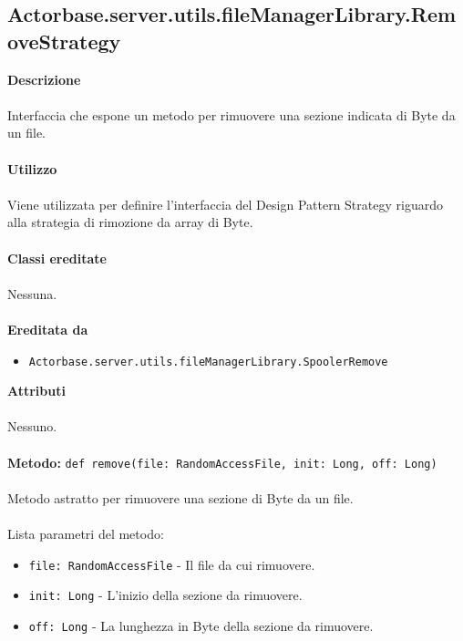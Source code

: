\documentclass[a4paper]{article}
\begin{document}
	\subsection{Actorbase.server.utils.fileManagerLibrary.RemoveStrategy}
		\textbf{Descrizione}
		\\ \\
		Interfaccia che espone un metodo per rimuovere una sezione indicata di Byte da un file.
		\\ \\
		\textbf{Utilizzo}
		\\ \\
		Viene utilizzata per definire l'interfaccia del Design Pattern Strategy riguardo alla strategia di rimozione da array di Byte.
		\\ \\
		\textbf{Classi ereditate}
		\\ \\
		Nessuna.
		\\ \\
		\textbf{Ereditata da}
		\begin{itemize}
			\item \texttt{Actorbase.server.utils.fileManagerLibrary.SpoolerRemove}
		\end{itemize}
		\textbf{Attributi}
		\\ \\
		Nessuno.
		\\ \\
		\textbf{Metodo:} \texttt{def remove(file: RandomAccessFile, init: Long, off: Long)}
		\\ \\
		Metodo astratto per rimuovere una sezione di Byte da un file.
		\\ \\
		Lista parametri del metodo:
		\begin{itemize}
			\item \texttt{file: RandomAccessFile} - Il file da cui rimuovere.
			\item \texttt{init: Long} - L'inizio della sezione da rimuovere.
			\item \texttt{off: Long} - La lunghezza in Byte della sezione da rimuovere.
		\end{itemize}
		
			
\end{document}

